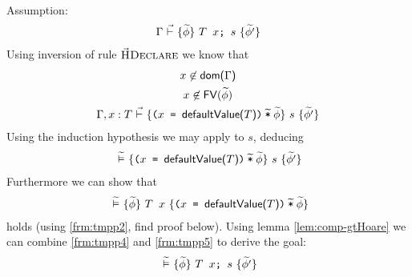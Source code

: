 \begin{proofatend}~\\
    Assumption:
    \begin{align}
    {\Gamma} \,\,\vec{\vdash}\,\, \{{\widetilde{\phi}}\} ~{\textup{\texttt{{\textup{\texttt{${T}$~${x}$}}};~{$s$}}}}~ \{{\widetilde{\phi'}}\}
    \end{align}
    Using inversion of rule $\textup{\textsc{\ensuremath{\vec{\text{H}}}Declare}}$ we know that
    \begin{gather}
    \label{frm:tmpp1}
    {x} \not\in \textup{\textmd{\textsf{dom($\Gamma$)}}} \\
    \label{frm:tmpp2}
    {x} \not \in {\textup{\textmd{\textsf{FV}}}(\widetilde{\phi})} \\
    {{\Gamma}, {x} : {T}} \,\,\vec{\vdash}\,\, \{{\textup{\texttt{${\textup{\texttt{(${\textup{\texttt{${x}$}}}$ = ${\textup{\texttt{${\textup{\textmd{\textsf{defaultValue(${T}$)}}}}$}}}$)}}}$\:$\widetilde{\textup{\texttt{*}}}$\:$\widetilde{\phi}$}}}\} ~{s}~ \{{\widetilde{\phi'}}\}
    \end{gather}
    Using the induction hypothesis we may apply  to $s$, deducing
    \begin{gather}
    \label{frm:tmpp4}
    {} \,\,\widetilde{\vDash}\,\, \{{\textup{\texttt{${\textup{\texttt{(${\textup{\texttt{${x}$}}}$ = ${\textup{\texttt{${\textup{\textmd{\textsf{defaultValue(${T}$)}}}}$}}}$)}}}$\:$\widetilde{\textup{\texttt{*}}}$\:$\widetilde{\phi}$}}}\} ~{s}~ \{{\widetilde{\phi'}}\}
    \end{gather}
    Furthermore we can show that
    \begin{gather}
    \label{frm:tmpp5}
    {} \,\,\widetilde{\vDash}\,\, \{{\widetilde{\phi}}\} ~{\textup{\texttt{${T}$~${x}$}}}~ \{{\textup{\texttt{${\textup{\texttt{(${\textup{\texttt{${x}$}}}$ = ${\textup{\texttt{${\textup{\textmd{\textsf{defaultValue(${T}$)}}}}$}}}$)}}}$\:$\widetilde{\textup{\texttt{*}}}$\:$\widetilde{\phi}$}}}\}
    \end{gather}
    holds (using \ref{frm:tmpp2}, find proof below).
    Using lemma \ref{lem:comp-gtHoare} we can combine \ref{frm:tmpp4} and \ref{frm:tmpp5} to derive the goal:
    \begin{align}
    {} \,\,\widetilde{\vDash}\,\, \{{\widetilde{\phi}}\} ~{\textup{\texttt{{\textup{\texttt{${T}$~${x}$}}};~{$s$}}}}~ \{{\widetilde{\phi'}}\}
    \end{align}
    

\end{proofatend}
